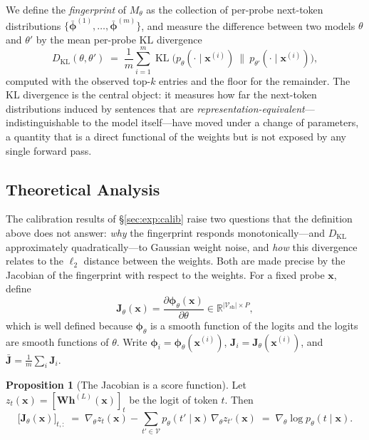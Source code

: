 \documentclass[11pt]{article}
\newcommand{\R}{\mathbb{R}}
\newcommand{\V}{\mathcal{V}}
\newcommand{\Vsh}{\mathcal{V}_{\mathrm{sh}}}
\newcommand{\KL}{\operatorname{KL}}
\theoremstyle{definition}
\newtheorem{proposition}{Proposition}
\begin{document}
We define the \emph{fingerprint} of $M_\theta$ as the collection of per-probe
next-token distributions $\{\bar{\bm{\phi}}^{(1)}, \dots,
\bar{\bm{\phi}}^{(m)}\}$, and measure the difference between two models
$\theta$ and $\theta'$ by the mean per-probe KL divergence
\begin{equation}
  D_{\mathrm{KL}}(\theta, \theta')
  \;=\; \frac1m \sum_{i=1}^m
    \KL\!\big(p_\theta(\cdot \mid \bm{x}^{(i)})\ \|\ p_{\theta'}(\cdot \mid \bm{x}^{(i)})\big),
  \label{eq:dkl}
\end{equation}
computed with the observed top-$k$ entries and the floor for the remainder.
The KL divergence is the central object: it measures how far the next-token
distributions induced by sentences that are \emph{representation-equivalent}---
indistinguishable to the model itself---have moved under a change of
parameters, a quantity that is a direct functional of the weights but is not
exposed by any single forward pass.

\subsection{Theoretical Analysis}
\label{sec:theory}

The calibration results of \S\ref{sec:exp:calib} raise two questions that the
definition above does not answer: \emph{why} the fingerprint responds
monotonically---and $D_{\mathrm{KL}}$ approximately quadratically---to Gaussian
weight noise, and \emph{how} this divergence relates to the $\ell_2$ distance
between the weights. Both are made precise by the Jacobian of the fingerprint
with respect to the weights. For a fixed probe $\bm{x}$, define
\begin{equation}
  \bm{J}_\theta(\bm{x}) = \frac{\partial \bm{\phi}_\theta(\bm{x})}{\partial \theta}
    \in \R^{|\Vsh| \times P},
  \label{eq:jacobian}
\end{equation}
which is well defined because $\bm{\phi}_\theta$ is a smooth function of the
logits and the logits are smooth functions of $\theta$. Write
$\bm{\phi}_i = \bm{\phi}_\theta(\bm{x}^{(i)})$, $\bm{J}_i =
\bm{J}_\theta(\bm{x}^{(i)})$, and $\bar{\bm{J}} = \tfrac1m \sum_i \bm{J}_i$.

\begin{proposition}[The Jacobian is a score function]
\label{prop:score}
Let $z_t(\bm{x}) = [\bm{W}\bm{h}^{(L)}(\bm{x})]_t$ be the logit of token $t$.
Then
\begin{equation}
  \big[\bm{J}_\theta(\bm{x})\big]_{t,:} \;=\;
  \nabla_\theta z_t(\bm{x}) - \sum_{t' \in \V} p_\theta(t' \mid \bm{x})\,\nabla_\theta z_{t'}(\bm{x})
  \;=\; \nabla_\theta \log p_\theta(t \mid \bm{x}).
  \label{eq:score}
\end{equation}
\end{proposition}
\end{document}

